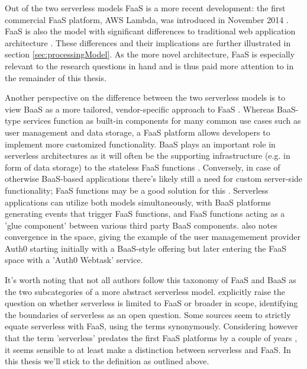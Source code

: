 Out of the two serverless models FaaS is a more recent development: the first commercial FaaS platform, AWS Lambda, was introduced in November 2014 \parencite{awslambda0218}.
FaaS is also the model with significant differences to traditional web application architecture \parencite{robert2016serverlessarchitectures}. These differences and their implications are further illustrated in section \ref{sec:processingModel}. As the more novel architecture, FaaS is especially relevant to the research questions in hand and is thus paid more attention to in the remainder of this thesis.

Another perspective on the difference between the two serverless models is to view BaaS as a more tailored, vendor-specific approach to FaaS \parencite{van2017spec}. Whereas BaaS-type services function as built-in components for many common use cases such as user management and data storage, a FaaS platform allows developers to implement more customized functionality. BaaS plays an important role in serverless architectures as it will often be the supporting infrastructure (e.g. in form of data storage) to the stateless FaaS functions \parencite{cncf18serverlessWG}. Conversely, in case of otherwise BaaS-based applications there's likely still a need for custom server-side functionality; FaaS functions may be a good solution for this \parencite{robert2016serverlessarchitectures}. Serverless applications can utilize both models simultaneously, with BaaS platforms generating events that trigger FaaS functions, and FaaS functions acting as a 'glue component' between various third party BaaS components. \textcite{robert2016serverlessarchitectures} also notes convergence in the space, giving the example of the user managemement provider Auth0 starting initially with a BaaS-style offering but later entering the FaaS space with a 'Auth0 Webtask' service.

It's worth noting that not all authors follow this taxonomy of FaaS and BaaS as the two subcategories of a more abstract serverless model. \textcite{baldini17currentTrends} explicitly raise the question on whether serverless is limited to FaaS or broader in scope, identifying the boundaries of serverless as an open question. Some sources \parencite[][among others]{hendrickson16openlambda,mcgrath17implement,varghese18next} seem to strictly equate serverless with FaaS, using the terms synonymously. Considering however that the term 'serverless' predates the first FaaS platforms by a couple of years \parencite{robert2016serverlessarchitectures}, it seems sensible to at least make a distinction between serverless and FaaS. In this thesis we'll stick to the \textcite{cncf18serverlessWG} definition as outlined above.

